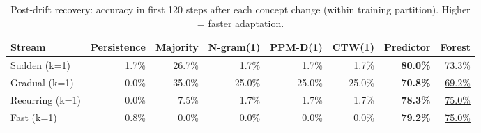 \begin{table}[h]
\centering
\caption{Post-drift recovery: accuracy in first 120 steps after each concept change (within training partition). Higher = faster adaptation.}
\label{tab:postdrift}
\begin{tabular}{lrrrrrrr}
\toprule
Stream & Persistence & Majority & N-gram(1) & PPM-D(1) & CTW(1) & Predictor & Forest \\
\midrule
Sudden (k=1) & 1.7\% & 26.7\% & 1.7\% & 1.7\% & 1.7\% & \textbf{80.0\%} & \underline{73.3\%} \\
Gradual (k=1) & 0.0\% & 35.0\% & 25.0\% & 25.0\% & 25.0\% & \textbf{70.8\%} & \underline{69.2\%} \\
Recurring (k=1) & 0.0\% & 7.5\% & 1.7\% & 1.7\% & 1.7\% & \textbf{78.3\%} & \underline{75.0\%} \\
Fast (k=1) & 0.8\% & 0.0\% & 0.0\% & 0.0\% & 0.0\% & \textbf{79.2\%} & \underline{75.0\%} \\
\bottomrule
\end{tabular}
\end{table}
